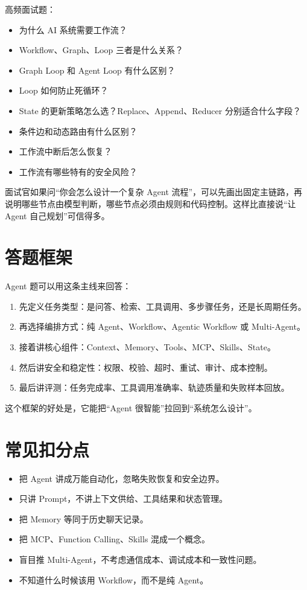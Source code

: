 \documentclass[10pt,a4paper]{ctexart}
\begin{document}
高频面试题：


\begin{itemize}[itemsep=2pt, topsep=4pt]
  \item 为什么 AI 系统需要工作流？
  \item Workflow、Graph、Loop 三者是什么关系？
  \item Graph Loop 和 Agent Loop 有什么区别？
  \item Loop 如何防止死循环？
  \item State 的更新策略怎么选？Replace、Append、Reducer 分别适合什么字段？
  \item 条件边和动态路由有什么区别？
  \item 工作流中断后怎么恢复？
  \item 工作流有哪些特有的安全风险？
\end{itemize}


面试官如果问“你会怎么设计一个复杂 Agent 流程”，可以先画出固定主链路，再说明哪些节点由模型判断，哪些节点必须由规则和代码控制。这样比直接说“让 Agent 自己规划”可信得多。



\section{答题框架}


Agent 题可以用这条主线来回答：


\begin{enumerate}[itemsep=2pt, topsep=4pt]
  \item 先定义任务类型：是问答、检索、工具调用、多步骤任务，还是长周期任务。
  \item 再选择编排方式：纯 Agent、Workflow、Agentic Workflow 或 Multi-Agent。
  \item 接着讲核心组件：Context、Memory、Tools、MCP、Skills、State。
  \item 然后讲安全和稳定性：权限、校验、超时、重试、审计、成本控制。
  \item 最后讲评测：任务完成率、工具调用准确率、轨迹质量和失败样本回放。
\end{enumerate}


这个框架的好处是，它能把“Agent 很智能”拉回到“系统怎么设计”。



\section{常见扣分点}

\begin{itemize}[itemsep=2pt, topsep=4pt]
  \item 把 Agent 讲成万能自动化，忽略失败恢复和安全边界。
  \item 只讲 Prompt，不讲上下文供给、工具结果和状态管理。
  \item 把 Memory 等同于历史聊天记录。
  \item 把 MCP、Function Calling、Skills 混成一个概念。
  \item 盲目推 Multi-Agent，不考虑通信成本、调试成本和一致性问题。
  \item 不知道什么时候该用 Workflow，而不是纯 Agent。
\end{itemize}
\end{document}
